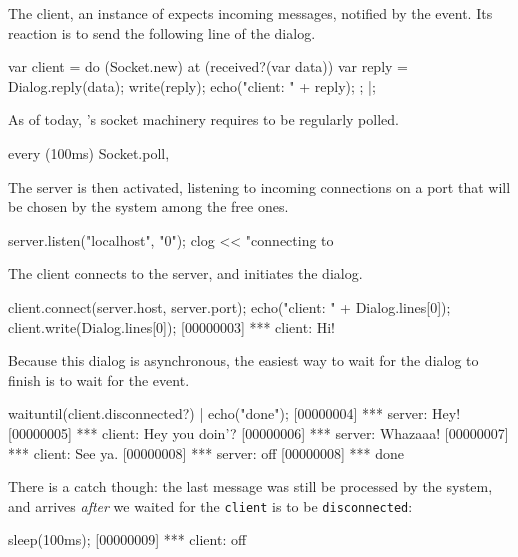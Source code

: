 The client, an instance of  expects incoming messages,
notified by the  event.  Its reaction is to send the
following line of the dialog.

\begin{urbiscript}
var client =
  do (Socket.new)
  {
    at (received?(var data))
    {
      var reply = Dialog.reply(data);
      write(reply);
      echo("client: " + reply);
    };
  }|;
\end{urbiscript}

As of today, \us's socket machinery requires to be regularly polled.

\begin{urbiscript}
every (100ms)
  Socket.poll,
\end{urbiscript}

The server is then activated, listening to incoming connections on a port
that will be chosen by the system among the free ones.

\begin{urbiscript}
server.listen("localhost", "0");
clog << "connecting to %
\end{urbiscript}

The client connects to the server, and initiates the dialog.

\begin{urbiscript}
client.connect(server.host, server.port);
echo("client: " + Dialog.lines[0]);
client.write(Dialog.lines[0]);
[00000003] *** client: Hi!
\end{urbiscript}

Because this dialog is asynchronous, the easiest way to wait for the dialog
to finish is to wait for the  event.

\begin{urbiscript}
waituntil(client.disconnected?) | echo("done");
[00000004] *** server: Hey!
[00000005] *** client: Hey you doin'?
[00000006] *** server: Whazaaa!
[00000007] *** client: See ya.
[00000008] *** server: off
[00000008] *** done
\end{urbiscript}

There is a catch though: the last message was still be processed by the
system, and arrives \emph{after} we waited for the \lstinline{client} is to
be \lstinline{disconnected}:

\begin{urbiscript}
sleep(100ms);
[00000009] *** client: off
\end{urbiscript}

